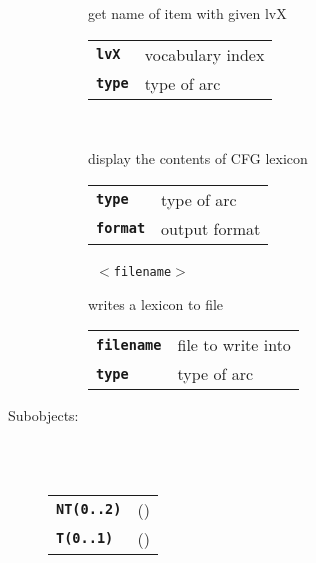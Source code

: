 \begin{description}
\begin{description}
        get name of item with given lvX

      \begin{tabular}{ll}
 \texttt{\textbf{lvX}} &  vocabulary index  \\
 \texttt{\textbf{type}} &  type of arc  \\
      \end{tabular}
       \texttt{  } \

        display the contents of CFG lexicon

      \begin{tabular}{ll}
 \texttt{\textbf{type}} &    type of arc  \\
 \texttt{\textbf{format}} &  output format  \\
      \end{tabular}
       \texttt{ $<$filename$>$ } \

        writes a lexicon to file

      \begin{tabular}{ll}
 \texttt{\textbf{filename}} &  file to write into  \\
 \texttt{\textbf{type}} &       type of arc  \\
      \end{tabular}
    \end{description}

  \item[Subobjects:] \hfill \\
\ 
    \begin{tabular}{ll}
      \texttt{\textbf{NT(0..2)}} & (\Jref{module}{}) \\
      \texttt{\textbf{T(0..1)}} & (\Jref{module}{}) \\
    \end{tabular}
\vspace{3mm}

\end{description}

